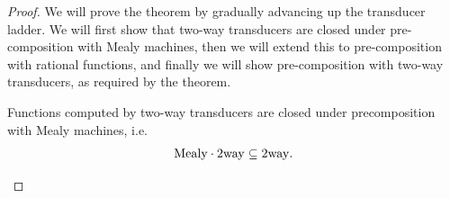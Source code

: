 \begin{proof}
    We will prove the theorem by gradually advancing up the transducer ladder. We will first show that two-way transducers are closed under pre-composition with Mealy machines, then we will extend this to pre-composition with rational functions, and finally we will show pre-composition with two-way transducers, as required by the theorem.

    \begin{lemma}\label{lem:2dfa-precomposition-with-mealy}
        Functions computed by two-way transducers are closed under precomposition with Mealy machines, i.e.
        \begin{align*}
        \mathrm{Mealy} \cdot \mathrm{2way} 
        \subseteq \mathrm{2way}.   
        \end{align*}
    \end{lemma}


\end{proof}
